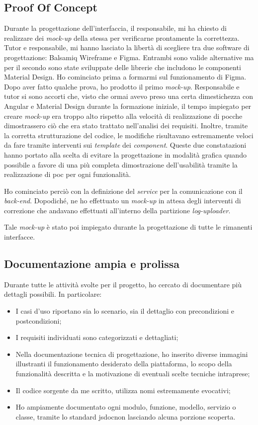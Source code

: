 \subsection{Proof Of Concept}
Durante la progettazione dell'interfaccia, il responsabile, mi ha chiesto di realizzare dei \textit{mock-up} della stessa per verificarne prontamente la correttezza.
Tutor e responsabile, mi hanno lasciato la libertà di scegliere tra due software di progettazione: Balsamiq Wireframe e Figma. Entrambi sono valide alternative ma per il secondo sono state sviluppate delle librerie che includono le componenti Material Design.
Ho cominciato prima a formarmi sul funzionamento di Figma. Dopo aver fatto qualche prova, ho prodotto il primo \textit{mock-up}. Responsabile e tutor si sono accorti che, visto che ormai avevo preso una certa dimestichezza con Angular e Material Design durante la formazione iniziale, il tempo impiegato per creare \textit{mock-up} era troppo alto rispetto alla velocità di realizzazione di \acrshort{poc}\glsfirstoccur che dimostrassero ciò che era stato trattato nell'analisi dei requisiti. Inoltre, tramite la corretta strutturazione del codice, le modifiche risultavano estremamente veloci da fare tramite interventi sui \textit{template} dei \textit{component}.
Queste due constatazioni hanno portato alla scelta di evitare la progettazione in modalità grafica quando possibile a favore di una più completa dimostrazione dell'usabilità tramite la realizzazione di \acrlong{poc} per ogni funzionalità.

Ho cominciato perciò con la definizione del \textit{service} per la comunicazione con il \textit{back-end}. Dopodiché, ne ho effettuato un \textit{mock-up} in attesa degli interventi di correzione che andavano effettuati all'interno della partizione \textit{log-uploader}.

Tale \textit{mock-up} è stato poi impiegato durante la progettazione di tutte le rimanenti interfacce.
\newpage
\subsection{Documentazione ampia e prolissa}
Durante tutte le attività svolte per il progetto, ho cercato di documentare più dettagli possibili.
In particolare:
\begin{itemize}
    \item I casi d'uso riportano sia lo scenario, sia il dettaglio con precondizioni e postcondizioni;
    \item I requisiti individuati sono categorizzati e dettagliati;
    \item Nella documentazione tecnica di progettazione, ho inserito diverse immagini illustranti il funzionamento desiderato della piattaforma, lo scopo della funzionalità descritta e la motivazione di eventuali scelte tecniche intraprese;
    \item Il codice sorgente da me scritto, utilizza nomi estremamente evocativi; \item Ho ampiamente documentato ogni modulo, funzione, modello, servizio o classe, tramite lo standard \gls{jsdoc}\glsfirstoccur non lasciando alcuna porzione scoperta.
\end{itemize}

